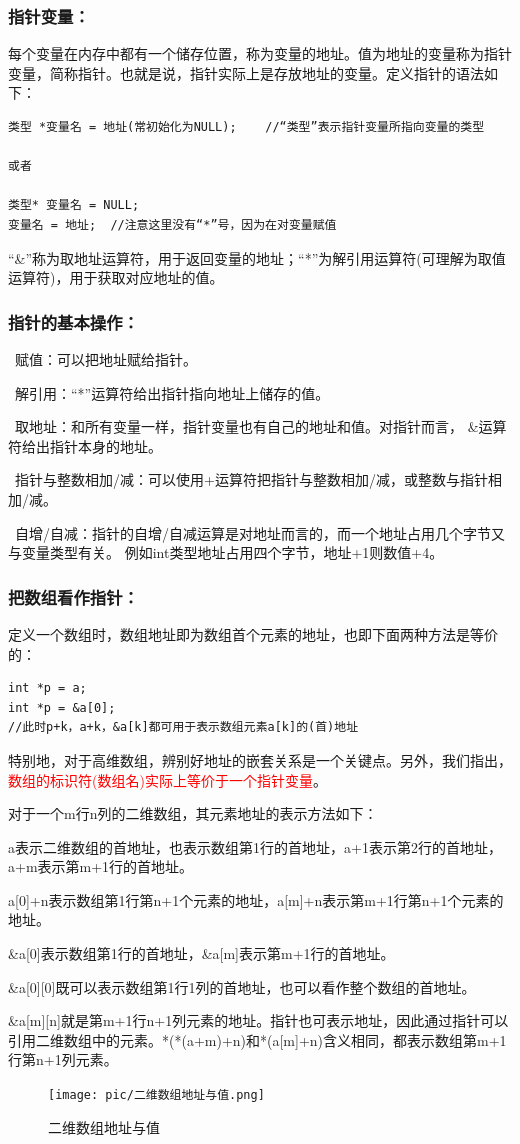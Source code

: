 \documentclass[zihao=-4,UTF8]{report}
\begin{document}
\subsubsection{指针变量：}
每个变量在内存中都有一个储存位置，称为变量的地址。值为地址的变量称为指针变量，简称指针。也就是说，指针实际上是存放地址的变量。定义指针的语法如下：
\begin{lstlisting}
类型 *变量名 = 地址(常初始化为NULL);    //“类型”表示指针变量所指向变量的类型

或者

类型* 变量名 = NULL;
变量名 = 地址;  //注意这里没有“*”号，因为在对变量赋值
\end{lstlisting}\par
{\small\color{gray}“\&”称为取地址运算符，用于返回变量的地址；“*”为解引用运算符(可理解为取值运算符)，用于获取对应地址的值。}

\subsubsection{指针的基本操作：}
\ 赋值：可以把地址赋给指针。\par
{}\ 解引用：“*”运算符给出指针指向地址上储存的值。\par
{}\ 取地址：和所有变量一样，指针变量也有自己的地址和值。对指针而言，
\&运算符给出指针本身的地址。\par
{}\ 指针与整数相加/减：可以使用+运算符把指针与整数相加/减，或整数与指针相加/减。\par
{}\ 自增/自减：指针的自增/自减运算是对地址而言的，而一个地址占用几个字节又与变量类型有关。
{\small\color{gray}例如int类型地址占用四个字节，地址+1则数值+4。}
\subsubsection{把数组看作指针：}
定义一个数组时，数组地址即为数组首个元素的地址，也即下面两种方法是等价的：
\begin{lstlisting}
int *p = a;
int *p = &a[0];
//此时p+k，a+k，&a[k]都可用于表示数组元素a[k]的(首)地址
\end{lstlisting}
特别地，对于高维数组，辨别好地址的嵌套关系是一个关键点。另外，我们指出，\textcolor{red}{数组的标识符(数组名)实际上等价于一个指针变量}。\par
{\small\color{gray}对于一个m行n列的二维数组，其元素地址的表示方法如下：\par
a表示二维数组的首地址，也表示数组第1行的首地址，a+1表示第2行的首地址，a+m表示第m+1行的首地址。\par a[0]+n表示数组第1行第n+1个元素的地址，a[m]+n表示第m+1行第n+1个元素的地址。\par \&a[0]表示数组第1行的首地址，\&a[m]表示第m+1行的首地址。 \par\&a[0][0]既可以表示数组第1行1列的首地址，也可以看作整个数组的首地址。 \par\&a[m][n]就是第m+1行n+1列元素的地址。指针也可表示地址，因此通过指针可以引用二维数组中的元素。*(*(a+m)+n)和*(a[m]+n)含义相同，都表示数组第m+1行第n+1列元素。}
\begin{figure}[H]
    \centering
    \texttt{[image: pic/二维数组地址与值.png]}
    \caption{二维数组地址与值}
\end{figure}
\end{document}
